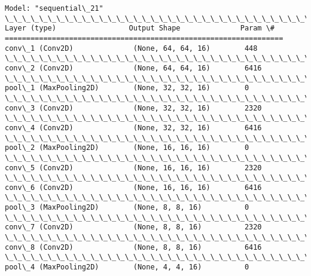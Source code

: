 \documentclass[11pt]{article}
\begin{document}
    \begin{Verbatim}[commandchars=\\\{\}]
Model: "sequential\_21"
\_\_\_\_\_\_\_\_\_\_\_\_\_\_\_\_\_\_\_\_\_\_\_\_\_\_\_\_\_\_\_\_\_\_\_\_\_\_\_\_\_\_\_\_\_\_\_\_\_\_\_\_\_\_\_\_\_\_\_\_\_\_\_\_\_
Layer (type)                 Output Shape              Param \#   
=================================================================
conv\_1 (Conv2D)              (None, 64, 64, 16)        448       
\_\_\_\_\_\_\_\_\_\_\_\_\_\_\_\_\_\_\_\_\_\_\_\_\_\_\_\_\_\_\_\_\_\_\_\_\_\_\_\_\_\_\_\_\_\_\_\_\_\_\_\_\_\_\_\_\_\_\_\_\_\_\_\_\_
conv\_2 (Conv2D)              (None, 64, 64, 16)        6416      
\_\_\_\_\_\_\_\_\_\_\_\_\_\_\_\_\_\_\_\_\_\_\_\_\_\_\_\_\_\_\_\_\_\_\_\_\_\_\_\_\_\_\_\_\_\_\_\_\_\_\_\_\_\_\_\_\_\_\_\_\_\_\_\_\_
pool\_1 (MaxPooling2D)        (None, 32, 32, 16)        0         
\_\_\_\_\_\_\_\_\_\_\_\_\_\_\_\_\_\_\_\_\_\_\_\_\_\_\_\_\_\_\_\_\_\_\_\_\_\_\_\_\_\_\_\_\_\_\_\_\_\_\_\_\_\_\_\_\_\_\_\_\_\_\_\_\_
conv\_3 (Conv2D)              (None, 32, 32, 16)        2320      
\_\_\_\_\_\_\_\_\_\_\_\_\_\_\_\_\_\_\_\_\_\_\_\_\_\_\_\_\_\_\_\_\_\_\_\_\_\_\_\_\_\_\_\_\_\_\_\_\_\_\_\_\_\_\_\_\_\_\_\_\_\_\_\_\_
conv\_4 (Conv2D)              (None, 32, 32, 16)        6416      
\_\_\_\_\_\_\_\_\_\_\_\_\_\_\_\_\_\_\_\_\_\_\_\_\_\_\_\_\_\_\_\_\_\_\_\_\_\_\_\_\_\_\_\_\_\_\_\_\_\_\_\_\_\_\_\_\_\_\_\_\_\_\_\_\_
pool\_2 (MaxPooling2D)        (None, 16, 16, 16)        0         
\_\_\_\_\_\_\_\_\_\_\_\_\_\_\_\_\_\_\_\_\_\_\_\_\_\_\_\_\_\_\_\_\_\_\_\_\_\_\_\_\_\_\_\_\_\_\_\_\_\_\_\_\_\_\_\_\_\_\_\_\_\_\_\_\_
conv\_5 (Conv2D)              (None, 16, 16, 16)        2320      
\_\_\_\_\_\_\_\_\_\_\_\_\_\_\_\_\_\_\_\_\_\_\_\_\_\_\_\_\_\_\_\_\_\_\_\_\_\_\_\_\_\_\_\_\_\_\_\_\_\_\_\_\_\_\_\_\_\_\_\_\_\_\_\_\_
conv\_6 (Conv2D)              (None, 16, 16, 16)        6416      
\_\_\_\_\_\_\_\_\_\_\_\_\_\_\_\_\_\_\_\_\_\_\_\_\_\_\_\_\_\_\_\_\_\_\_\_\_\_\_\_\_\_\_\_\_\_\_\_\_\_\_\_\_\_\_\_\_\_\_\_\_\_\_\_\_
pool\_3 (MaxPooling2D)        (None, 8, 8, 16)          0         
\_\_\_\_\_\_\_\_\_\_\_\_\_\_\_\_\_\_\_\_\_\_\_\_\_\_\_\_\_\_\_\_\_\_\_\_\_\_\_\_\_\_\_\_\_\_\_\_\_\_\_\_\_\_\_\_\_\_\_\_\_\_\_\_\_
conv\_7 (Conv2D)              (None, 8, 8, 16)          2320      
\_\_\_\_\_\_\_\_\_\_\_\_\_\_\_\_\_\_\_\_\_\_\_\_\_\_\_\_\_\_\_\_\_\_\_\_\_\_\_\_\_\_\_\_\_\_\_\_\_\_\_\_\_\_\_\_\_\_\_\_\_\_\_\_\_
conv\_8 (Conv2D)              (None, 8, 8, 16)          6416      
\_\_\_\_\_\_\_\_\_\_\_\_\_\_\_\_\_\_\_\_\_\_\_\_\_\_\_\_\_\_\_\_\_\_\_\_\_\_\_\_\_\_\_\_\_\_\_\_\_\_\_\_\_\_\_\_\_\_\_\_\_\_\_\_\_
pool\_4 (MaxPooling2D)        (None, 4, 4, 16)          0         

\end{Verbatim}
\end{document}
